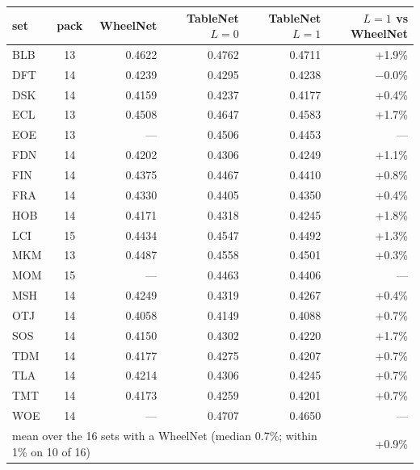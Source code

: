 \documentclass[11pt,letterpaper]{article}
\begin{document}
\begin{center}\small
\begin{tabular}{lcrrrr}
\toprule
set & pack & WheelNet & TableNet $L=0$ & TableNet $L=1$ & $L=1$ vs WheelNet \\
\midrule
BLB & 13 & 0.4622 & 0.4762 & 0.4711 & +1.9\% \\
DFT & 14 & 0.4239 & 0.4295 & 0.4238 & $-$0.0\% \\
DSK & 14 & 0.4159 & 0.4237 & 0.4177 & +0.4\% \\
ECL & 13 & 0.4508 & 0.4647 & 0.4583 & +1.7\% \\
EOE & 13 & --- & 0.4506 & 0.4453 & --- \\
FDN & 14 & 0.4202 & 0.4306 & 0.4249 & +1.1\% \\
FIN & 14 & 0.4375 & 0.4467 & 0.4410 & +0.8\% \\
FRA & 14 & 0.4330 & 0.4405 & 0.4350 & +0.4\% \\
HOB & 14 & 0.4171 & 0.4318 & 0.4245 & +1.8\% \\
LCI & 15 & 0.4434 & 0.4547 & 0.4492 & +1.3\% \\
MKM & 13 & 0.4487 & 0.4558 & 0.4501 & +0.3\% \\
MOM & 15 & --- & 0.4463 & 0.4406 & --- \\
MSH & 14 & 0.4249 & 0.4319 & 0.4267 & +0.4\% \\
OTJ & 14 & 0.4058 & 0.4149 & 0.4088 & +0.7\% \\
SOS & 14 & 0.4150 & 0.4302 & 0.4220 & +1.7\% \\
TDM & 14 & 0.4177 & 0.4275 & 0.4207 & +0.7\% \\
TLA & 14 & 0.4214 & 0.4306 & 0.4245 & +0.7\% \\
TMT & 14 & 0.4173 & 0.4259 & 0.4201 & +0.7\% \\
WOE & 14 & --- & 0.4707 & 0.4650 & --- \\
\midrule
\multicolumn{5}{l}{mean over the 16 sets with a WheelNet (median 0.7\%; within 1\% on 10 of 16)} & +0.9\% \\
\bottomrule
\end{tabular}
\end{center}
\end{document}
